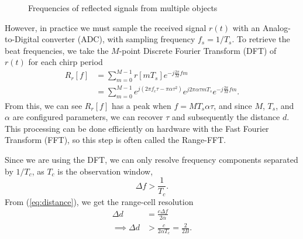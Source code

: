 \begin{figure}[h]
	\centering
	\label{fig:received}
	\caption{Frequencies of reflected signals from multiple objects}
\end{figure}

However, in practice we must sample the received signal $r(t)$ with an
Analog-to-Digital converter (ADC), with sampling frequency $f_s = 1/T_s$. To retrieve
the beat frequencies, we take the $M$-point Discrete Fourier Transform (DFT) of
$r(t)$ for each chirp period
\begin{align}
	R_r[f] &= \sum_{m=0}^{M-1} r[mT_s] e^{-j\frac{2\pi}{M}fm} \label{eq:range-fft}\\
	&= \sum_{m=0}^{M-1} e^{j(2\pi f_c\tau -
	\pi\alpha\tau^2)}e^{j2\pi\alpha\tau mT_s} e^{-j\frac{2\pi}{M}fm}.
\end{align}
From this, we can see $R_r[f]$ has a peak when $f=MT_s\alpha\tau$, and since
$M$, $T_s$, and $\alpha$ are configured parameters, we can recover $\tau$ and
subsequently the distance $d$.
This processing can be done efficiently on hardware with the Fast Fourier Transform (FFT),
so this step is often called the Range-FFT. 

Since we are using the DFT, we can only resolve frequency components
separated by $1/T_c$, as $T_c$ is the observation window,
\begin{equation}
	\Delta f > \frac{1}{T_c}.	
\end{equation}
From (\ref{eq:distance}), we get the range-cell resolution
\begin{align}
	\Delta d &= \frac{c\Delta f}{2\alpha}\\
	\implies \Delta d &> \frac{c}{2\alpha T_c} = \frac{2}{2B}. \label{eq:range-res}
\end{align}

